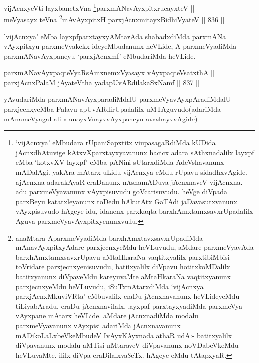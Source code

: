 \begin{shl}
vijAcnxyeVti layxbanetxVna \footnote{`vijAcnxya' eMbudara rUpaniSapxtitx viupasagaRdiMda kUDida jAcnxdhAtuvige kAtxvXparxtayxyavanunx hacicx adara sAthxnadalilx layxpf eMba `kotxvXV layxpf' eMba pANini sUtarxdiMda AdeVshavanunx mADalAgi. yakAra mAtarx uLidu vijAcnxya eMdu rUpavu sidadhxvAgide. ajAcnxna adarakAyaR eraDanunx nAshamADuva jAcnxnaveV vijAcnxna. adu parxmeVyavanunx vAyxpisuvudu goVcarisuvudu. heVge diVpada parxBeyu katatxleyanunx toDedu hAkutAtx GaTAdi jaDavasutxvanunx vAyxpisuvudo hAgeye idu, idanenx parxkaqta barxhAmxtamxsavxrUpadalilx Aguva parxmeVyavAyxpitxyenunxvudu.}parxmANavAyxpitxrucayxteV ||  \\
meVyasayx teVna \footnote{anaMtara AparxmeVyadiMda barxhAmxtavxsavxrUpadiMda mAnavAyxpitxyAdare parxjecnxyeMdu heVLuvudu, aMdare parxmeVyavAda barxhAmxtamxsavxrUpavu aMtaHkaraNa vaqtitxyalilx parxtibiMbisi  toVridare parxjecnxyenisuvudu, batitxyalilx diVpavu hotitxkoMDalilx batitxyanunx diVpaveMdu kareyuvaMte aMtaHkaraNa vaqtitxyanunx parxjecnxyeMdu heVLuvudu, iSuTxmAtarxdiMda `vijAcnxya parxjAcnxMkuviVRta' eMbuvalilx eraDu jAcnxnavanunx heVLideyeMdu tiLiyabAradu, eraDu jAcnxnavilalx, layxpaf parxtayxyadiMda parxmeVya vAyxpane mAtarx heVLide. aMdare jAcnxnadiMda modalu parxmeVyavanunx vAyxpisi adariMda jAcnxnavanunx mADikoLaLxbeVkeMbudeV IvAyxKAyxnada athaR udA:- batitxyalilx diVpavanunx modalu aMTisi nMtaraveV diVpavanunx noVDabeVkeMdu heVLuvaMte. ililx diVpa eraDilalxvaSeTx. hAgeye eMdu tAtapxyaR.}mAvAyxpitxH parxjAcnxmitayxBidhiVyateV \hfill || 836 ||  
\end{shl}


\begin{artha}
'vijAcnxya' eMba layxpfparxtayxyAMtavAda shabadxdiMda parxmANa vAyxpitxyu parxmeVyakekx ideyeMbudanunx heVLide, A parxmeVyadiMda parxmANavAyxpaneyu `parxjAcnxmf' eMbudariMda heVLide.
\end{artha}


\begin{shl}
parxmANavAyxpaqteVyaRsAmxnemxVyasayx vAyxpaqteVsatxthA ||  \\
parxjAcnxPalaM jAyateV\s tha yadapUvARdilakaSxNamf \hfill || 837 ||  
\end{shl}

\begin{artha}
yAvudariMda parxmANavAyxparadiMdalU parxmeVyavAyxpAra\-\break diMdalU parxjecnxyeMba Palavu apUvARdirUpadalilx uMTAguvudo(adariMda mAnameVyagaLalilx anoyxVnayxvAyxpaneyu avashayxvAgide).
\end{artha}

